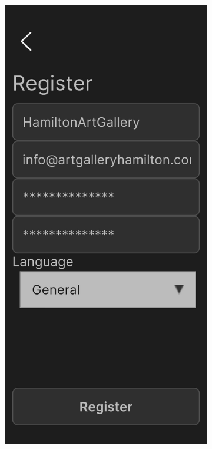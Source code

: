 \documentclass[12pt, titlepage]{article}
\begin{document}
\newpage
\begin{figure}[ht!]
    \centering
    \begin{subfigure}[b]{0.48\textwidth}
        \centering
        \includegraphics[width=\textwidth]{register2.png}

\end{subfigure}
\end{figure}
\end{document}
